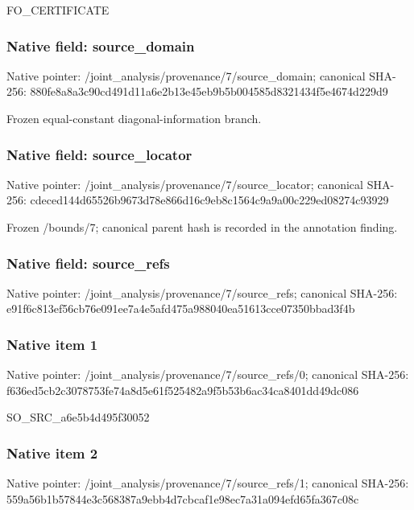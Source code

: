 \documentclass[10pt,a4paper]{article}
\begin{document}
\begingroup\raggedright\sloppy FO\_\allowbreak{}CERTIFICATE\par\endgroup

\subsubsection{Native field: source\_\allowbreak{}domain}
Native pointer: /joint\_\allowbreak{}analysis/provenance/7/source\_\allowbreak{}domain; canonical SHA-256: 880fe8a8a3c90cd491d11a6e2b13e45eb9b5b004585d8321434f5e4674d229d9

\begingroup\raggedright\sloppy Frozen equal-constant diagonal-information branch.\par\endgroup

\subsubsection{Native field: source\_\allowbreak{}locator}
Native pointer: /joint\_\allowbreak{}analysis/provenance/7/source\_\allowbreak{}locator; canonical SHA-256: cdeced144d65526b9673d78e866d16c9eb8c1564c9a9a00c229ed08274c93929

\begingroup\raggedright\sloppy Frozen /\allowbreak{}bounds/\allowbreak{}7;\allowbreak{} canonical parent hash is recorded in the annotation finding.\par\endgroup

\subsubsection{Native field: source\_\allowbreak{}refs}
Native pointer: /joint\_\allowbreak{}analysis/provenance/7/source\_\allowbreak{}refs; canonical SHA-256: e91f6c813ef56cb76e091ee7a4e5afd475a988040ea51613cce07350bbad3f4b

\subsubsection{Native item 1}
Native pointer: /joint\_\allowbreak{}analysis/provenance/7/source\_\allowbreak{}refs/0; canonical SHA-256: f636ed5cb2c3078753fe74a8d5e61f525482a9f5b53b6ac34ca8401dd49dc086

\begingroup\raggedright\sloppy SO\_\allowbreak{}SRC\_\allowbreak{}a6e5b4d495f30052\par\endgroup

\subsubsection{Native item 2}
Native pointer: /joint\_\allowbreak{}analysis/provenance/7/source\_\allowbreak{}refs/1; canonical SHA-256: 559a56b1b57844e3c568387a9ebb4d7cbcaf1e98ec7a31a094efd65fa367c08c
\end{document}
